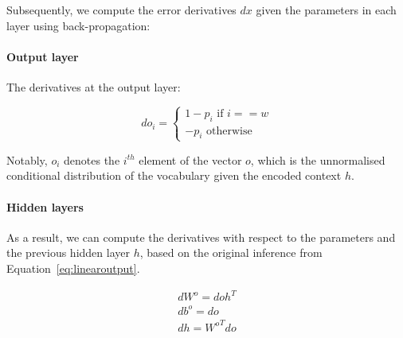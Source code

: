 Subsequently, we compute the error derivatives $dx$ given the parameters in each layer using back-propagation:

\paragraph{Output layer}

The derivatives at the output layer:

\begin{equation}
do_i = 
\begin{cases}
1 - p_i \text{ if } i == w \\
-p_i \text{     otherwise}
\end{cases}
\end{equation}

Notably, $o_i$ denotes the $i^{th}$ element of the vector $o$, which is the unnormalised conditional distribution of the vocabulary given the encoded context $h$. 

\paragraph{Hidden layers}
As a result, we can compute the derivatives with respect to the parameters and the previous hidden layer $h$, based on the original inference from Equation~\ref{eq:linearoutput}. 

\begin{equation}
\begin{aligned}
dW^o = doh^T \\
db^o = do \\ 
dh = {W^o}^Tdo \\
\end{aligned}
\end{equation}

%
%
%


